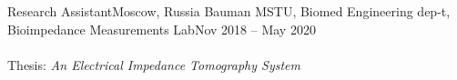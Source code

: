 \resumeSubheading
{Research Assistant}{Moscow, Russia}
{Bauman MSTU, Biomed Engineering dep-t, Bioimpedance Measurements Lab}{Nov 2018 -- May 2020}
{\ \ \ \\}\\
{Thesis: \textit{An Electrical Impedance Tomography System}}
